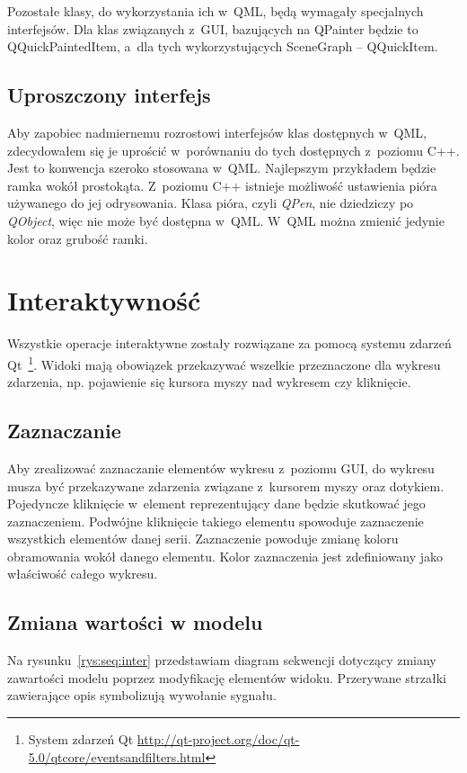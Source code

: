 Pozostałe klasy, do wykorzystania ich w~QML, będą wymagały specjalnych interfejsów. Dla klas związanych z~GUI, bazujących na QPainter będzie to QQuickPaintedItem, a~dla tych wykorzystujących SceneGraph -- QQuickItem.

\subsection{Uproszczony interfejs}
Aby zapobiec nadmiernemu rozrostowi interfejsów klas dostępnych w~QML, zdecydowałem się je uprościć w~porównaniu do tych dostępnych z~poziomu C++. Jest to konwencja szeroko stosowana w~QML. Najlepszym przykładem będzie ramka wokół prostokąta. Z~poziomu C++ istnieje możliwość ustawienia pióra używanego do jej odrysowania. Klasa pióra, czyli \textit{QPen}, nie dziedziczy po \textit{QObject}, więc nie może być dostępna w~QML. W~QML można zmienić jedynie kolor oraz grubość ramki.

\section{Interaktywność}
Wszystkie operacje interaktywne zostały rozwiązane za pomocą systemu zdarzeń Qt~\footnote{System zdarzeń Qt \url{http://qt-project.org/doc/qt-5.0/qtcore/eventsandfilters.html}}. Widoki mają obowiązek przekazywać wszelkie przeznaczone dla wykresu zdarzenia, np. pojawienie się kursora myszy nad wykresem czy kliknięcie.

\subsection{Zaznaczanie}
Aby zrealizować zaznaczanie elementów wykresu z~poziomu GUI, do wykresu musza być przekazywane zdarzenia związane z~kursorem myszy oraz dotykiem. Pojedyncze kliknięcie w~element reprezentujący dane będzie skutkować jego zaznaczeniem. Podwójne kliknięcie takiego elementu spowoduje zaznaczenie wszystkich elementów danej serii. Zaznaczenie powoduje zmianę koloru obramowania wokół danego elementu. Kolor zaznaczenia jest zdefiniowany jako właściwość całego wykresu.

\subsection{Zmiana wartości w modelu}
Na rysunku~\ref{rys:seq:inter} przedstawiam diagram sekwencji dotyczący zmiany zawartości modelu poprzez modyfikację elementów widoku. Przerywane strzałki zawierające opis symbolizują wywołanie sygnału.

